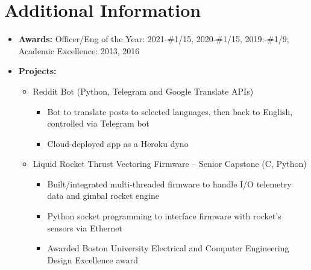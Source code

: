 \documentclass{article}
\begin{document}
\section{Additional Information} 
\begin{itemize}
    \itemsep0.2em
    \item \textbf{Awards: }Officer/Eng of the Year: 2021-\#1/15, 2020-\#1/15, 2019:-\#1/9; Academic Excellence: 2013, 2016
    \item \textbf{Projects: }
    \vspace{-\topsep} \vspace{0.2em}
    \begin{itemize}
        \itemsep0em
        \item Reddit Bot (Python, Telegram and Google Translate APIs)
        \vspace{-\topsep} \vspace{0.2em}
        \begin{itemize}
            \itemsep0em
            \item Bot to translate posts to selected languages, then back to English, controlled via Telegram bot
            \item Cloud-deployed app as a Heroku dyno
        \end{itemize}
        \item Liquid Rocket Thrust Vectoring Firmware – Senior Capstone (C, Python)
        \vspace{-\topsep} \vspace{0.2em}
        \begin{itemize}
            \itemsep0em
            \item Built/integrated multi-threaded firmware to handle I/O telemetry data and gimbal rocket engine
            \item Python socket programming to interface firmware with rocket’s sensors via Ethernet
            \item Awarded Boston University Electrical and Computer Engineering Design Excellence award
        \end{itemize}
    \end{itemize} \end{itemize} 

\end{document}
